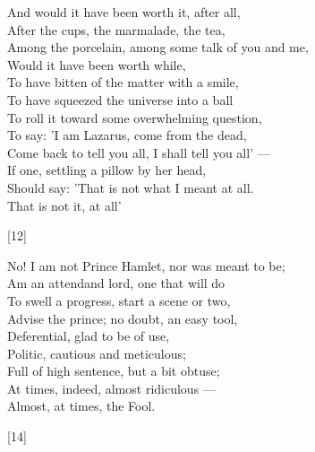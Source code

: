 \documentclass{article}
\begin{document}
\begin{multicols}{2}
\begin{minipage}{9cm}
\begin{turn}{75}
    \begin{minipage}{9cm}
        \begin{flushright}
        \centering
        \onehalfspacing
        And would it have been worth it, after all,\\
        After the cups, the marmalade, the tea,\\
        Among the porcelain, among some talk of you and me,\\
        Would it have been worth while,\\
        To have bitten of the matter with a smile,\\
        To have squeezed the universe into a ball\\
        To roll it toward some overwhelming question,\\
        To say: 'I am Lazarus, come from the dead, \\
        Come back to tell you all, I shall tell you all' ---\\
        If one, settling a pillow by her head,\\
        \quad{} Should say: 'That is not what I meant at all.\\
        \quad{} That is not it, at all'
        \begin{center}[12]\end{center}
        \end{flushright}
    \end{minipage}
\end{turn}

\begin{minipage}{8cm}
    \flushright
    No! I am not Prince Hamlet, nor was meant to be;\\
    Am an attendand lord, one that will do\\
    To swell a progress, start a scene or two,\\
    Advise the prince; no doubt, an easy tool,\\
    Deferential, glad to be of use,\\
    Politic, cautious and meticulous;\\
    Full of high sentence, but a bit obtuse;\\
    At times, indeed, almost ridiculous ---\\
    Almost, at times, the Fool.\\
    \begin{center}[14]\end{center}
\end{minipage}

\end{minipage}

\end{multicols}
\end{document}
